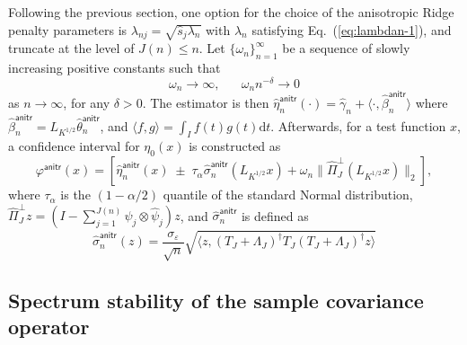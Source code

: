 \documentclass[aos]{imsart}
\renewcommand{\hat}{\widehat}
\newcommand{\ud}{\mathrm d}
\newcommand{\anitr}{\mathsf{anitr}}
\theoremstyle{plain}
\theoremstyle{definition}
\theoremstyle{definition}
\begin{document}
Following the previous section, one option for the choice of the anisotropic Ridge penalty parameters is $\lambda_{nj}=\sqrt{\hat s_j\lambda_n}$ with $\lambda_n$ satisfying Eq.~(\ref{eq:lambdan-1}),
and truncate at the level of $J(n)\leq n$.
Let $\{\omega_n\}_{n=1}^{\infty}$ be a sequence of slowly increasing positive constants such that
\begin{equation}
\omega_n\to\infty,\;\;\;\;\;\;\omega_n n^{-\delta}\to 0
\label{eq:omega}
\end{equation}
as $n\to\infty$, for any $\delta>0$.
The estimator is then $\hat\eta_n^\anitr(\cdot)=\hat\gamma_n + \langle\cdot,\hat\beta_n^\anitr\rangle$ where $\hat\beta_n^\anitr = L_{K^{1/2}}\hat\theta_n^\anitr$,
and $\langle f,g\rangle = \int_I f(t)g(t)\ud t$.
Afterwards, for a test function $x$, a confidence interval for $\eta_0(x)$ is constructed as
$$
\varphi^\anitr(x) = [\hat\eta_n^\anitr(x)\;\pm\; \tau_{\alpha}\hat\sigma_n^\anitr(L_{K^{1/2}}x) + \omega_n\|\hat\Pi_J^\perp (L_{K^{1/2}}x)\|_2],
$$
where $\tau_{\alpha}$ is the $(1-\alpha/2)$ quantile of the standard Normal distribution, $\hat\Pi_J^\perp z=(I-\sum_{j=1}^{J(n)}\hat\psi_j\otimes\hat\psi_j)z$, and $\hat\sigma_n^\anitr$ is defined as
$$
\hat\sigma_n^\anitr(z) = \frac{\sigma_\varepsilon}{\sqrt{n}}\sqrt{\langle z, (T_J+\Lambda_J)^\dagger T_J(T_J+\Lambda_J)^\dagger z\rangle}
$$


\subsection{Spectrum stability of the sample covariance operator}
\end{document}
